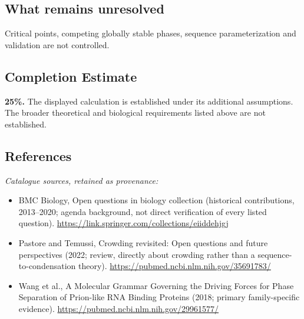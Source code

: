 \documentclass[11pt]{article}
\begin{document}
\subsection{What remains unresolved}
Critical points, competing globally stable phases, sequence parameterization and validation are not controlled.
\subsection{Completion Estimate}
\textbf{25\%.} The displayed calculation is established under its additional assumptions. The broader theoretical and biological requirements listed above are not established.
\subsection{References}
\noindent\emph{Catalogue sources, retained as provenance:}
\begin{itemize}
\item BMC Biology, Open questions in biology collection (historical contributions, 2013--2020; agenda background, not direct verification of every listed question). \url{https://link.springer.com/collections/eiiddehjgj}
\item Pastore and Temussi, Crowding revisited: Open questions and future perspectives (2022; review, directly about crowding rather than a sequence-to-condensation theory). \url{https://pubmed.ncbi.nlm.nih.gov/35691783/}
\item Wang et al., A Molecular Grammar Governing the Driving Forces for Phase Separation of Prion-like RNA Binding Proteins (2018; primary family-specific evidence). \url{https://pubmed.ncbi.nlm.nih.gov/29961577/}
\end{itemize}
\end{document}
